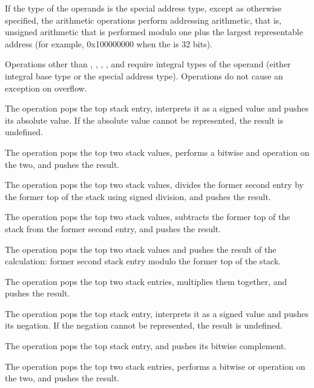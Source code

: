 If the type of the operands is the special
address type, except as otherwise specified, the arithmetic operations
perform addressing arithmetic, that is, unsigned arithmetic that is performed
modulo one plus the largest representable address (for example, 0x100000000
when the  is 32 bits). 

Operations other than \DWOPabs{},
\DWOPdiv{}, \DWOPminus{}, \DWOPmul{}, \DWOPneg{} and \DWOPplus{} require integral
types of the operand (either integral base type or the special address
type).  Operations do not cause an exception on overflow.


\begin{enumerate}[1. ]
\itembfnl{\DWOPabsTARG}
The \DWOPabsTARG{} operation pops the top stack entry, interprets
it as a signed value and pushes its absolute value. If the
absolute value cannot be represented, the result is undefined.

\itembfnl{\DWOPandTARG}
The \DWOPandTARG{} operation pops the top two stack values, performs
a bitwise and operation on the two, and pushes the result.

\itembfnl{\DWOPdivTARG}
The \DWOPdivTARG{} operation pops the top two stack values, divides the former second entry by
the former top of the stack using signed division, and pushes the result.

\itembfnl{\DWOPminusTARG}
The \DWOPminusTARG{} operation pops the top two stack values, subtracts the former top of the
stack from the former second entry, and pushes the result.

\itembfnl{\DWOPmodTARG}
The \DWOPmodTARG{} operation pops the top two stack values and pushes the result of the
calculation: former second stack entry modulo the former top of the stack.

\itembfnl{\DWOPmulTARG}
The \DWOPmulTARG{} operation pops the top two stack entries, multiplies them together, and
pushes the result.

\itembfnl{\DWOPnegTARG}
The \DWOPnegTARG{} operation pops the top stack entry, interprets
it as a signed value and pushes its negation. If the negation
cannot be represented, the result is undefined.

\itembfnl{\DWOPnotTARG}
The \DWOPnotTARG{} operation pops the top stack entry, and pushes
its bitwise complement.

\itembfnl{\DWOPorTARG}
The \DWOPorTARG{} operation pops the top two stack entries, performs
a bitwise or operation on the two, and pushes the result.


\end{enumerate}
